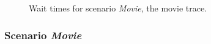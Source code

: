\documentclass[12pt]{article}
\newcommand{\Lquatro}{\textit{Movie}}
\begin{document}
\begin{figure}[t]
  \centering
  \caption{Wait times for scenario \Lquatro{}, the movie trace.}
  \label{fig:eve}
\end{figure}

\subsubsection{Scenario \Lquatro{}}
\label{sec:scenario-l4}
\end{document}
